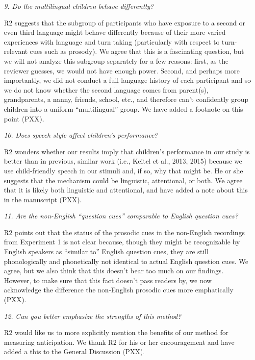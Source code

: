 \documentclass[11pt,a4paper]{letter} %
\begin{document}
\begin{letter}{}
\noindent \textit{9. Do the multilingual children behave differently?}

\noindent R2 suggests that the subgroup of participants who have exposure to a second or even third language might behave differently because of their more varied experiences with language and turn taking (particularly with respect to turn-relevant cues such as prosody). We agree that this is a fascinating question, but we will not analyze this subgroup separately for a few reasons: first, as the reviewer guesses, we would not have enough power. Second, and perhaps more importantly, we did not conduct a full language history of each participant and so we do not know whether the second language comes from parent(s), grandparents, a nanny, friends, school, etc., and therefore can't confidently group children into a uniform ``multilingual'' group. We have added a footnote on this point (PXX).

\noindent \textit{10. Does speech style affect children's performance?}

\noindent R2 wonders whether our results imply that children's performance in our study is better than in previous, similar work (i.e., Keitel et al., 2013, 2015) because we use child-friendly speech in our stimuli and, if so, why that might be. He or she suggests that the mechanism could be linguistic, attentional, or both. We agree that it is likely both linguistic and attentional, and have added a note about this in the manuscript (PXX).

\noindent \textit{11. Are the non-English ``question cues'' comparable to English question cues?}

\noindent R2 points out that the status of the prosodic cues in the non-English recordings from Experiment 1 is not clear because, though they might be recognizable by English speakers as ``similar to'' English question cues, they are still phonologically and phonetically not identical to actual English question cues. We agree, but we also think that this doesn't bear too much on our findings. However, to make sure that this fact doesn't pass readers by, we now acknowledge the difference the non-English prosodic cues more emphatically (PXX).

\noindent \textit{12. Can you better emphasize the strengths of this method?}

\noindent R2 would like us to more explicitly mention the benefits of our method for measuring anticipation. We thank R2 for his or her encouragement and have added a this to the General Discussion (PXX).


\end{letter}
\end{document}
